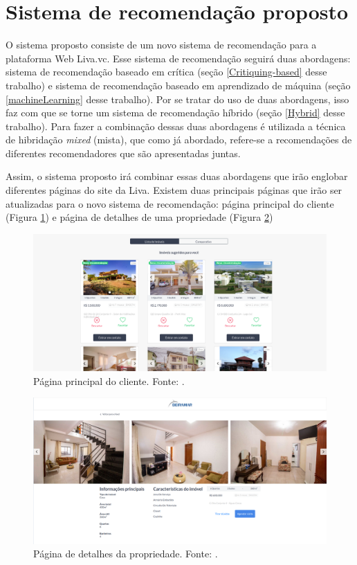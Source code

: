 \section{Sistema de recomendação proposto}
\label{section_sr}

O sistema proposto consiste de um novo sistema de recomendação para a plataforma Web Liva.vc. Esse sistema de recomendação seguirá duas abordagens: sistema de recomendação baseado em crítica (seção \ref{Critiquing-based} desse trabalho) e sistema de recomendação baseado em aprendizado de máquina (seção \ref{machineLearning} desse trabalho). Por se tratar do uso de duas abordagens, isso faz com que se torne um sistema de recomendação híbrido (seção \ref{Hybrid} desse trabalho). Para fazer a combinação dessas duas abordagens é utilizada a técnica de hibridação \textit{mixed} (mista), que como já abordado, refere-se a recomendações de diferentes recomendadores que são apresentadas juntas.

Assim, o sistema proposto irá combinar essas duas abordagens que irão englobar diferentes páginas do site da Liva. Existem duas principais páginas que irão ser atualizadas para o novo sistema de recomendação: página principal do cliente (Figura \ref{fig:pagina_principal}) e página de detalhes de uma propriedade (Figura \ref{fig:pagina_detalhes})

\begin{figure}[H]
    \centering
    \includegraphics[scale=0.33]{figuras/proposta/pagina_principal.png}
    \caption[Página principal do cliente]{Página principal do cliente. Fonte:  \cite{Liva:2019}.}
    \label{fig:pagina_principal}
\end{figure}

\begin{figure}[H]
    \centering
    \includegraphics[scale=0.23]{figuras/proposta/pagina_detalhes.png}
    \caption[Página de detalhes da propriedade]{Página de detalhes da propriedade. Fonte: \cite{Liva:2019}.}
    \label{fig:pagina_detalhes}
\end{figure}

